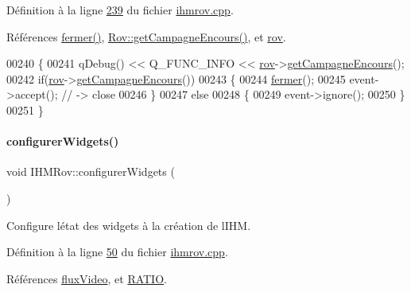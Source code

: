 Définition à la ligne \hyperlink{ihmrov_8cpp_source_l00239}{239} du fichier \hyperlink{ihmrov_8cpp_source}{ihmrov.\+cpp}.



Références \hyperlink{ihmrov_8cpp_source_l00253}{fermer()}, \hyperlink{rov_8cpp_source_l00175}{Rov\+::get\+Campagne\+Encours()}, et \hyperlink{ihmrov_8h_source_l00047}{rov}.


\begin{DoxyCode}
00240 \{
00241     qDebug() << Q\_FUNC\_INFO << \hyperlink{class_i_h_m_rov_a777ca33fdb295ba6b6773e880356fa1e}{rov}->\hyperlink{class_rov_a59d1a6d2ca83324e6efc0b74f2cff686}{getCampagneEncours}();
00242     \textcolor{keywordflow}{if}(\hyperlink{class_i_h_m_rov_a777ca33fdb295ba6b6773e880356fa1e}{rov}->\hyperlink{class_rov_a59d1a6d2ca83324e6efc0b74f2cff686}{getCampagneEncours}())
00243     \{
00244         \hyperlink{class_i_h_m_rov_ac0c8c09dc2ef1c06e1008647dcd2d6b8}{fermer}();
00245         \textcolor{keyword}{event}->accept(); \textcolor{comment}{// -> close}
00246     \}
00247     \textcolor{keywordflow}{else}
00248     \{
00249         \textcolor{keyword}{event}->ignore();
00250     \}
00251 \}
\end{DoxyCode}
\mbox{\label{class_i_h_m_rov_aba47130fb875a01eefa09bc875affe6c}} 
\paragraph{\texorpdfstring{configurer\+Widgets()}{configurerWidgets()}}
{\footnotesize\ttfamily void I\+H\+M\+Rov\+::configurer\+Widgets (\begin{DoxyParamCaption}{ }\end{DoxyParamCaption})\hspace{0.3cm}{\ttfamily [private]}}



Configure l\textquotesingle{}état des widgets à la création de l\textquotesingle{}I\+HM. 



Définition à la ligne \hyperlink{ihmrov_8cpp_source_l00050}{50} du fichier \hyperlink{ihmrov_8cpp_source}{ihmrov.\+cpp}.



Références \hyperlink{ihmrov_8h_source_l00050}{flux\+Video}, et \hyperlink{ihmrov_8h_source_l00027}{R\+A\+T\+IO}.



